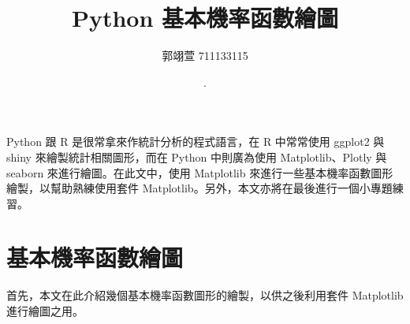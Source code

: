 \geometry{a4paper,left=2.5cm,right=2.5cm,top=2cm,bottom=2cm}
\usepackage{fancyhdr}
\pagestyle{fancy}


\title{{\MB Python 基本機率函數繪圖}}	%
\author{{\BB 郭翊萱 711133115}}				%
\date{{. }} 			
 

\maketitle
\fontsize{12}{22pt}\selectfont 

Python 跟 R 是很常拿來作統計分析的程式語言，在 R 中常常使用 ggplot2 與 shiny 來繪製統計相關圖形，而在 Python 中則廣為使用 Matplotlib、Plotly 與 seaborn 來進行繪圖。在此文中，使用 Matplotlib 來進行一些基本機率函數圖形繪製，以幫助熟練使用套件 Matplotlib。另外，本文亦將在最後進行一個小專題練習。

\section{基本機率函數繪圖}
首先，本文在此介紹幾個基本機率函數圖形的繪製，以供之後利用套件 Matplotlib 進行繪圖之用。

